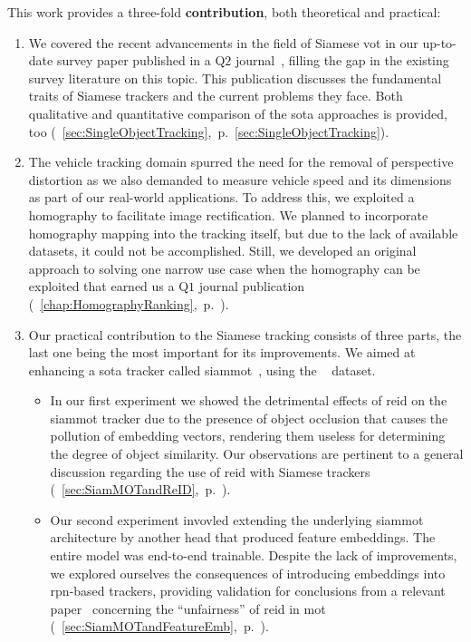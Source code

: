 This work provides a three-fold \textbf{contribution}, both theoretical and practical:
\begin{enumerate}
    \item We covered the recent advancements in the field of Siamese \gls{vot} in our up-to-date survey paper published in a Q$2$ journal~\cite{ondrasovic2021siamese}, filling the gap in the existing survey literature on this topic. This publication discusses the fundamental traits of Siamese trackers and the current problems they face. Both qualitative and quantitative comparison of the \gls{sota} approaches is provided, too (\sectiontext{}~\ref{sec:SingleObjectTracking},~p.~\ref{sec:SingleObjectTracking}).
    \item The vehicle tracking domain spurred the need for the removal of perspective distortion as we also demanded to measure vehicle speed and its dimensions as part of our real-world applications. To address this, we exploited a homography to facilitate image rectification. We planned to incorporate homography mapping into the tracking itself, but due to the lack of available datasets, it could not be accomplished. Still, we developed an original approach to solving one narrow use case when the homography can be exploited that earned us a Q$1$ journal publication~\cite{ondrasovic2021homography} (\chaptertext{}~\ref{chap:HomographyRanking},~p.~\pageref{chap:HomographyRanking}).
    \item Our practical contribution to the Siamese tracking consists of three parts, the last one being the most important for its improvements. We aimed at enhancing a \gls{sota} tracker called \gls{siammot}~\cite{shuai2021siammot}, using the \uadetrac{}~\cite{wen2020uadetrac} dataset.
          \begin{itemize}
              \item In our first experiment we showed the detrimental effects of \gls{reid} on the \gls{siammot} tracker due to the presence of object occlusion that causes the pollution of embedding vectors, rendering them useless for determining the degree of object similarity. Our observations are pertinent to a general discussion regarding the use of \gls{reid} with Siamese trackers (\sectiontext{}~\ref{sec:SiamMOTandReID},~p.~\pageref{sec:SiamMOTandReID}).
              \item Our second experiment invovled extending the underlying \gls{siammot} architecture by another head that produced feature embeddings. The entire model was end-to-end trainable. Despite the lack of improvements, we explored ourselves the consequences of introducing embeddings into \gls{rpn}-based trackers, providing validation for conclusions from a relevant paper~\cite{zhang2021fairmot} concerning the ``unfairness'' of \gls{reid} in \gls{mot} (\sectiontext{}~\ref{sec:SiamMOTandFeatureEmb},~p.~\pageref{sec:SiamMOTandFeatureEmb}).

\end{itemize}
\end{enumerate}

